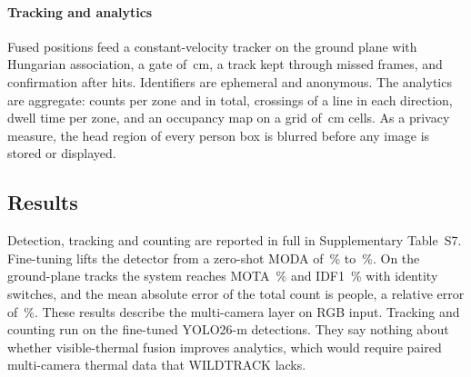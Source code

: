 \paragraph{Tracking and analytics}
Fused positions feed a constant-velocity tracker on the ground plane with Hungarian association, a gate of \cfgTrackGate{}\,cm, a track kept through \cfgTrackMiss{} missed frames, and confirmation after \cfgTrackHits{} hits. Identifiers are ephemeral and anonymous. The analytics are aggregate: counts per zone and in total, crossings of a line in each direction, dwell time per zone, and an occupancy map on a grid of \cfgGroundCell{}\,cm cells. As a privacy measure, the head region of every person box is blurred before any image is stored or displayed.

\subsection{Results}
Detection, tracking and counting are reported in full in Supplementary Table~S7. Fine-tuning lifts the detector from a zero-shot MODA of \camDetZeroShotModa{}\,\% to \camDetFineTunedModa{}\,\%. On the ground-plane tracks the system reaches MOTA \camTrackMota{}\,\% and IDF1 \camTrackIdfOne{}\,\% with \camTrackSwitches{} identity switches, and the mean absolute error of the total count is \camCountMae{} people, a relative error of \camCountRelErr{}\,\%. These results describe the multi-camera layer on RGB input. Tracking and counting run on the fine-tuned YOLO26-m detections. They say nothing about whether visible-thermal fusion improves analytics, which would require paired multi-camera thermal data that WILDTRACK lacks.
